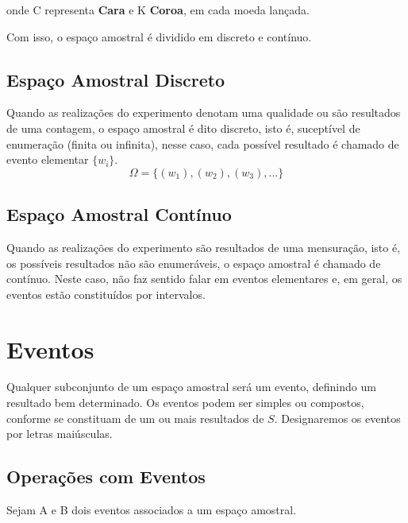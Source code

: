 onde C representa \textbf{Cara} e K \textbf{Coroa}, em cada moeda
lançada.\vskip0.3cm

Com isso, o espaço amostral é dividido em discreto e contínuo.


\subsection{Espaço Amostral Discreto}

Quando as realizações do experimento denotam uma qualidade ou são
resultados de uma contagem, o espaço amostral é dito discreto,
isto é, suceptível de enumeração (finita ou infinita), nesse caso,
cada possível resultado é chamado de evento elementar $\{w_{i}\}$.
$$ \Omega = \{ (w_{1}),(w_{2}),(w_{3}),... \}  $$


\subsection{Espaço Amostral Contínuo}

Quando as realizações do experimento são resultados de uma
mensuração, isto é, os possíveis resultados não são enumeráveis, o
espaço amostral é chamado de contínuo. Neste caso, não faz sentido
falar em eventos elementares e, em geral, os eventos estão
constituídos por intervalos.


\section{Eventos}

Qualquer subconjunto de um espaço amostral será um evento,
definindo um resultado bem determinado. Os eventos podem ser
simples ou compostos, conforme se constituam de um ou mais
resultados de $S$. Designaremos os eventos por letras maiúsculas.


\subsection{Operações com Eventos}

Sejam A e B dois eventos associados a um espaço amostral.

